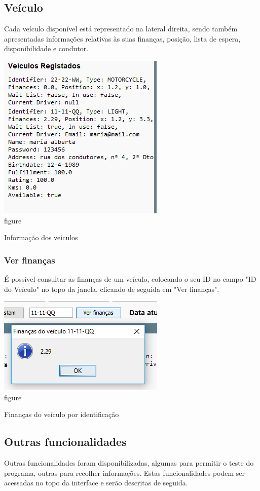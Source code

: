 \documentclass[a4paper]{article}
\begin{document}
\subsection{Veículo}
Cada veículo disponível está representado na lateral direita, sendo também apresentadas informações relativas às suas finanças, posição, lista de espera, disponibilidade e condutor.
\begin{center}
  \includegraphics[scale=0.75]{veiculo_info}\\
  \caption{figure}{Informação dos veículos}
  \label{fig:picture}
\end{center}
\subsubsection{Ver finanças}
É possível consultar as finanças de um veículo, colocando o seu ID no campo "ID do Veículo" no topo da janela, clicando de seguida em "Ver finanças".
\begin{center}
  \includegraphics[scale=0.75]{veiculo_financas}\\
  \caption{figure}{Finanças do veículo por identificação}
  \label{fig:picture}
\end{center}

\subsection{Outras funcionalidades}
Outras funcionalidades foram disponibilizadas, algumas para permitir o teste do programa, outras para recolher informações. Estas funcionalidades podem ser acessadas no topo da interface e serão descritas de seguida.
\end{document}
